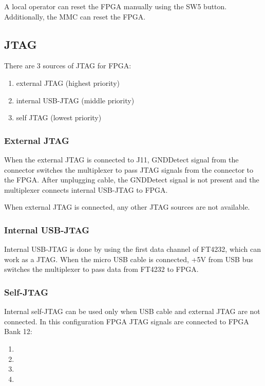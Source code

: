 \documentclass[12pt,oneside,a4]{article}
\begin{document}
A local operator can reset the FPGA manually using the SW5 button. Additionally, the MMC can reset the FPGA.

\subsection{JTAG}
There are 3 sources of JTAG for FPGA:
\begin{enumerate}
	\item external JTAG (highest priority)
	\item internal USB-JTAG (middle priority)
	\item self JTAG (lowest priority)
\end{enumerate}

\subsubsection{External JTAG}
When the external JTAG is connected to J11, GNDDetect signal from the connector switches the multiplexer to pass JTAG signals from the connector to the FPGA.  After unplugging cable, the GNDDetect signal is not present and the multiplexer connects internal USB-JTAG to FPGA.

When external JTAG is connected, any other JTAG sources are not available.

\subsubsection{Internal USB-JTAG}
Internal USB-JTAG is done by using the first data channel of FT4232, which can work as a JTAG. When the micro USB cable is connected, +5V
from USB bus switches the multiplexer to pass data from FT4232 to FPGA.

\subsubsection{Self-JTAG}
Internal self-JTAG can be used only when USB cable and external JTAG are not connected. In this configuration FPGA JTAG signals are connected to FPGA Bank 12:
\begin{enumerate}
	\item {}
	\item {}
	\item {}
	\item {}
\end{enumerate}
\end{document}
